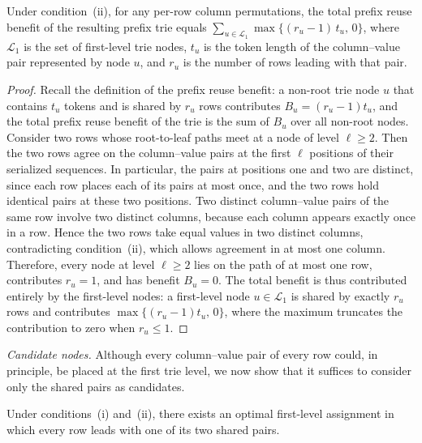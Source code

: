 \begin{observation}
\label{obs:level1}
Under condition~(ii), for any per-row column permutations, the total prefix reuse benefit of the resulting prefix trie equals $\sum_{u\in\mathcal{L}_1}\max\{(r_u-1)\,t_u,\,0\}$, where $\mathcal{L}_1$ is the set of first-level trie nodes, $t_u$ is the token length of the column--value pair represented by node $u$, and $r_u$ is the number of rows leading with that pair.
\end{observation}

\begin{proof}
Recall the definition of the prefix reuse benefit: a non-root trie node $u$ that contains $t_u$ tokens and is shared by $r_u$ rows contributes $B_u=(r_u-1)t_u$, and the total prefix reuse benefit of the trie is the sum of $B_u$ over all non-root nodes. Consider two rows whose root-to-leaf paths meet at a node of level $\ell\geq 2$. Then the two rows agree on the column--value pairs at the first $\ell$ positions of their serialized sequences. In particular, the pairs at positions one and two are distinct, since each row places each of its pairs at most once, and the two rows hold identical pairs at these two positions. Two distinct column--value pairs of the same row involve two distinct columns, because each column appears exactly once in a row. Hence the two rows take equal values in two distinct columns, contradicting condition~(ii), which allows agreement in at most one column. Therefore, every node at level $\ell\geq 2$ lies on the path of at most one row, contributes $r_u=1$, and has benefit $B_u=0$. The total benefit is thus contributed entirely by the first-level nodes: a first-level node $u\in\mathcal{L}_1$ is shared by exactly $r_u$ rows and contributes $\max\{(r_u-1)t_u,\,0\}$, where the maximum truncates the contribution to zero when $r_u\leq 1$.
\end{proof}

\emph{Candidate nodes.}
Although every column--value pair of every row could, in principle, be placed at the first trie level, we now show that it suffices to consider only the shared pairs as candidates.

\begin{lemma}
\label{lem:shared-pairs}
Under conditions~(i) and~(ii), there exists an optimal first-level assignment in which every row leads with one of its two shared pairs.
\end{lemma}

